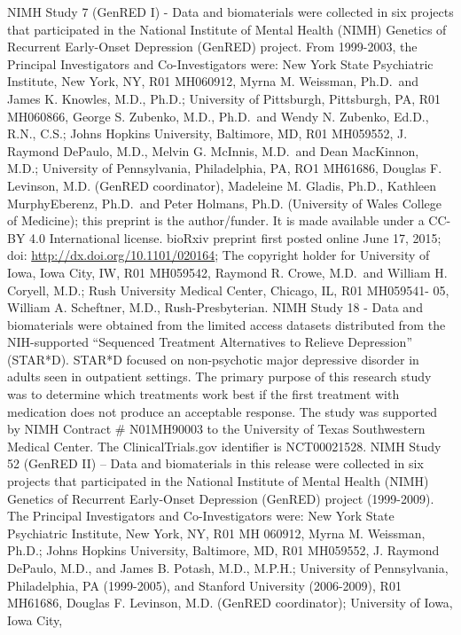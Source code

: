 \documentclass[]{article}
\begin{document}
NIMH Study 7 (GenRED I) - Data and biomaterials were collected in six
projects that participated in the National Institute of Mental Health
(NIMH) Genetics of Recurrent Early-Onset Depression (GenRED) project.
From 1999-2003, the Principal Investigators and Co-Investigators were:
New York State Psychiatric Institute, New York, NY, R01 MH060912, Myrna
M. Weissman, Ph.D.~and James K. Knowles, M.D., Ph.D.; University of
Pittsburgh, Pittsburgh, PA, R01 MH060866, George S. Zubenko, M.D.,
Ph.D.~and Wendy N. Zubenko, Ed.D., R.N., C.S.; Johns Hopkins University,
Baltimore, MD, R01 MH059552, J. Raymond DePaulo, M.D., Melvin G.
McInnis, M.D.~and Dean MacKinnon, M.D.; University of Pennsylvania,
Philadelphia, PA, RO1 MH61686, Douglas F. Levinson, M.D. (GenRED
coordinator), Madeleine M. Gladis, Ph.D., Kathleen MurphyEberenz,
Ph.D.~and Peter Holmans, Ph.D. (University of Wales College of
Medicine); this preprint is the author/funder. It is made available
under a CC-BY 4.0 International license. bioRxiv preprint first posted
online June 17, 2015; doi: \url{http://dx.doi.org/10.1101/020164}; The
copyright holder for University of Iowa, Iowa City, IW, R01 MH059542,
Raymond R. Crowe, M.D.~and William H. Coryell, M.D.; Rush University
Medical Center, Chicago, IL, R01 MH059541- 05, William A. Scheftner,
M.D., Rush-Presbyterian. NIMH Study 18 - Data and biomaterials were
obtained from the limited access datasets distributed from the
NIH-supported ``Sequenced Treatment Alternatives to Relieve Depression''
(STAR*D). STAR*D focused on non-psychotic major depressive disorder in
adults seen in outpatient settings. The primary purpose of this research
study was to determine which treatments work best if the first treatment
with medication does not produce an acceptable response. The study was
supported by NIMH Contract \# N01MH90003 to the University of Texas
Southwestern Medical Center. The ClinicalTrials.gov identifier is
NCT00021528. NIMH Study 52 (GenRED II) -- Data and biomaterials in this
release were collected in six projects that participated in the National
Institute of Mental Health (NIMH) Genetics of Recurrent Early-Onset
Depression (GenRED) project (1999-2009). The Principal Investigators and
Co-Investigators were: New York State Psychiatric Institute, New York,
NY, R01 MH 060912, Myrna M. Weissman, Ph.D.; Johns Hopkins University,
Baltimore, MD, R01 MH059552, J. Raymond DePaulo, M.D., and James B.
Potash, M.D., M.P.H.; University of Pennsylvania, Philadelphia, PA
(1999-2005), and Stanford University (2006-2009), R01 MH61686, Douglas
F. Levinson, M.D. (GenRED coordinator); University of Iowa, Iowa City,
\end{document}
